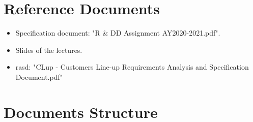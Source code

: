 \section{Reference Documents}

\begin{itemize}
    \item Specification document: "R \& DD Assignment AY2020-2021.pdf".
    \item Slides of the lectures.
    \item \gls{rasd}: "CLup - Customers Line-up Requirements Analysis and Specification Document.pdf"
\end{itemize}


\section{Documents Structure}